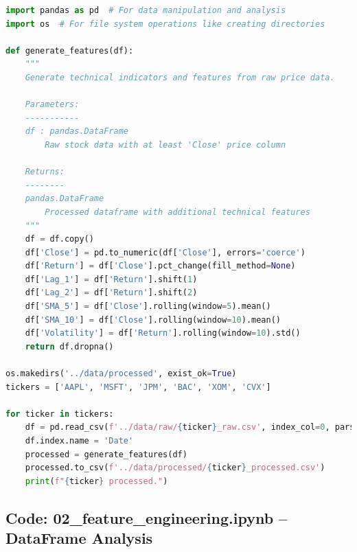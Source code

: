 \documentclass[12pt]{article}
\begin{document}
\begin{lstlisting}[language=Python]
import pandas as pd  # For data manipulation and analysis
import os  # For file system operations like creating directories

def generate_features(df):
    """
    Generate technical indicators and features from raw price data.
    
    Parameters:
    -----------
    df : pandas.DataFrame
        Raw stock data with at least 'Close' price column
        
    Returns:
    --------
    pandas.DataFrame
        Processed dataframe with additional technical features
    """
    df = df.copy()
    df['Close'] = pd.to_numeric(df['Close'], errors='coerce')
    df['Return'] = df['Close'].pct_change(fill_method=None)
    df['Lag_1'] = df['Return'].shift(1)
    df['Lag_2'] = df['Return'].shift(2)
    df['SMA_5'] = df['Close'].rolling(window=5).mean()
    df['SMA_10'] = df['Close'].rolling(window=10).mean()
    df['Volatility'] = df['Return'].rolling(window=10).std()
    return df.dropna()

os.makedirs('../data/processed', exist_ok=True)
tickers = ['AAPL', 'MSFT', 'JPM', 'BAC', 'XOM', 'CVX']

for ticker in tickers:
    df = pd.read_csv(f'../data/raw/{ticker}_raw.csv', index_col=0, parse_dates=True)
    df.index.name = 'Date'
    processed = generate_features(df)
    processed.to_csv(f'../data/processed/{ticker}_processed.csv')
    print(f"{ticker} processed.")
\end{lstlisting}

\subsection*{Code: 02\_feature\_engineering.ipynb – DataFrame Analysis}
\end{document}
